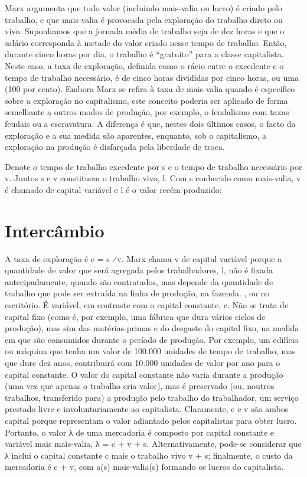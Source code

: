  \par 
Marx argumenta que todo valor (incluindo mais-valia ou lucro) é criado pelo trabalho, e que mais-valia é provocada pela exploração do trabalho direto ou vivo. Suponhamos que a jornada média de trabalho seja de dez horas e que o salário corresponda à metade do valor criado nesse tempo de trabalho. Então, durante cinco horas por dia, o trabalho é “gratuito” para a classe capitalista. Neste caso, a taxa de exploração, definida como o rácio entre o excedente e o tempo de trabalho necessário, é de cinco horas divididas por cinco horas, ou uma (100 por cento). Embora Marx se refira à taxa de mais-valia quando é específico sobre a exploração no capitalismo, este conceito poderia ser aplicado de forma semelhante a outros modos de produção, por exemplo, o feudalismo com taxas feudais ou a escravatura. A diferença é que, nestes dois últimos casos, o facto da exploração e a sua medida são aparentes, enquanto, sob o capitalismo, a exploração na produção é disfarçada pela liberdade de troca.
 \par 
Denote o tempo de trabalho excedente por s e o tempo de trabalho necessário por v. Juntos s e v constituem o trabalho vivo, l. Com s conhecido como mais-valia, v é chamado de capital variável e l é o valor recém-produzido:
 \par 
\section{Intercâmbio}
 \par 
A taxa de exploração é e = s ⁄v. Marx chama v de capital variável porque a quantidade de valor que será agregada pelos trabalhadores, l, não é fixada antecipadamente, quando são contratados, mas depende da quantidade de trabalho que pode ser extraída na linha de produção, na fazenda. , ou no escritório. É variável, em contraste com o capital constante, c. Não se trata de capital fixo (como é, por exemplo, uma fábrica que dura vários ciclos de produção), mas sim das matérias-primas e do desgaste do capital fixo, na medida em que são consumidos durante o período de produção. Por exemplo, um edifício ou máquina que tenha um valor de {\color{blue}100}.000 unidades de tempo de trabalho, mas que dure dez anos, contribuirá com {\color{blue}10}.{\color{blue}000} unidades de valor por ano para o capital constante. O valor do capital constante não varia durante a produção (uma vez que apenas o trabalho cria valor), mas é preservado (ou, noutros trabalhos, transferido para) a produção pelo trabalho do trabalhador, um serviço prestado livre e involuntariamente ao capitalista. Claramente, c e v são ambos capital porque representam o valor adiantado pelos capitalistas para obter lucro. Portanto, o valor λ de uma mercadoria é composto por capital constante e variável mais mais-valia, λ = c + v + s. Alternativamente, pode-se considerar que λ inclui o capital constante c mais o trabalho vivo v + s; finalmente, o custo da mercadoria é c + v, com a(s) mais-valia(s) formando os lucros do capitalista.
 \par 
